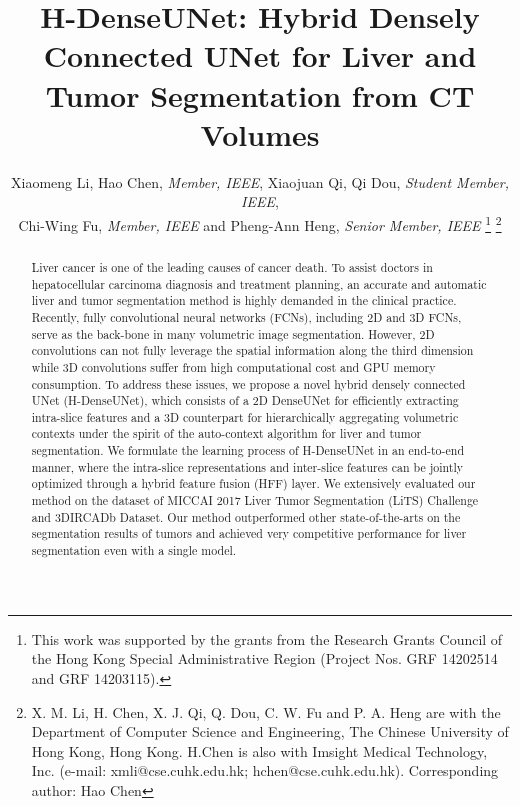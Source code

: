 \documentclass[journal]{IEEEtran}
\begin{document}
\title{H-DenseUNet: Hybrid Densely Connected UNet for Liver and Tumor Segmentation from CT Volumes}
\author{Xiaomeng Li, Hao Chen, \emph{Member, IEEE}, Xiaojuan Qi, Qi Dou, \emph{Student Member, IEEE}, \\
Chi-Wing Fu, \emph{Member, IEEE} and Pheng-Ann Heng, \emph{Senior Member, IEEE} \thanks{This work was supported by the grants from the Research Grants Council of the Hong Kong Special Administrative Region (Project Nos.  GRF 14202514 and GRF 14203115).} \thanks{
X. M. Li, H. Chen, X. J. Qi, Q. Dou, C. W. Fu and P. A. Heng are with the Department of Computer Science and Engineering, The Chinese University of Hong Kong, Hong Kong. H.Chen is also with Imsight Medical Technology, Inc. 
(e-mail: xmli@cse.cuhk.edu.hk; hchen@cse.cuhk.edu.hk). Corresponding author: Hao Chen}}















\newcommand{\revise}[1]{{\color{black}{#1}}}

\maketitle

\begin{abstract}
Liver cancer is one of the leading causes of cancer death. To assist doctors in hepatocellular carcinoma diagnosis and treatment planning, an accurate and automatic liver and tumor segmentation method is highly demanded in the clinical practice.
Recently, fully convolutional neural networks (FCNs), including 2D and 3D FCNs, serve as the back-bone in many volumetric image segmentation. However, 2D convolutions can not fully leverage the spatial information along the third dimension while 3D convolutions suffer from high computational cost and GPU memory consumption.
To address these issues, we propose a novel hybrid densely connected UNet (H-DenseUNet), which consists of a 2D DenseUNet for efficiently extracting intra-slice features and a 3D counterpart for hierarchically aggregating volumetric contexts under the spirit of the auto-context algorithm for liver and tumor segmentation.
We formulate the learning process of H-DenseUNet in an end-to-end manner, where the intra-slice representations and inter-slice features can be jointly optimized through a hybrid feature fusion (HFF) layer.
We extensively evaluated our method on the dataset of MICCAI 2017 Liver Tumor Segmentation (LiTS) Challenge and 3DIRCADb Dataset.
Our method outperformed other state-of-the-arts on the segmentation results of tumors and achieved very competitive performance for liver segmentation even with a single model. 
\end{abstract}
\end{document}
